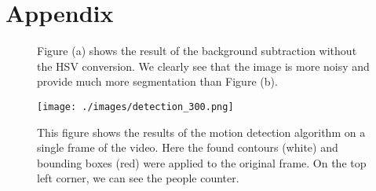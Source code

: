 \documentclass[runningheads]{llncs}
\begin{document}





\section*{Appendix}

\begin{figure}
\centering
{}
\hspace{0.01\linewidth}%
\caption{Figure (a) shows the result of the background subtraction without the HSV conversion. We clearly see that the image
is more noisy and provide much more segmentation than Figure (b).}
\label{object_detection}
\end{figure}

\begin{figure}
\texttt{[image: ./images/detection\_300.png]}
\caption{This figure shows the results of the motion detection algorithm on a single frame of the video. Here the found contours (white) and bounding boxes (red) were applied to the original frame. On the top left corner, we can see the people counter.}
\label{object_detection_result}
\end{figure}
\end{document}
